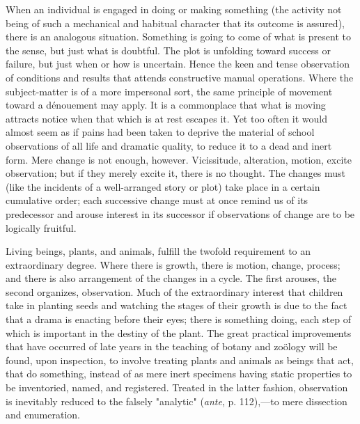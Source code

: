 \documentclass[letterpaper]{book}
\begin{document}
When an individual is engaged in doing or making something (the activity
not being of such a mechanical and habitual character that its outcome
is assured), there is an analogous situation. Something is going to come
of what is present to the sense, but just what is doubtful. The plot is
unfolding toward success or failure, but just when or how is uncertain.
Hence the keen and tense observation of conditions and results that
attends constructive manual operations. Where the subject-matter is of a
more impersonal sort, the same principle of movement toward a dénouement
may apply. It is a commonplace that what is moving attracts notice when
that which is at rest escapes it. Yet too often it would almost seem as
if pains had been taken to deprive the material of school observations
of all life and dramatic quality, to reduce it to a dead and inert form.
Mere change is not enough, however. Vicissitude, alteration, motion,
excite observation; but if they merely excite it, there is no thought.
The changes must (like the incidents of a well-arranged story or plot)
take place in a certain cumulative order; each successive change must at
once remind us of its predecessor and arouse interest in its successor
if observations of change are to be logically fruitful.


Living beings, plants, and animals, fulfill the twofold requirement to
an extraordinary degree. Where
there
is growth, there is motion, change, process; and there is also
arrangement of the changes in a cycle. The first arouses, the second
organizes, observation. Much of the extraordinary interest that children
take in planting seeds and watching the stages of their growth is due to
the fact that a drama is enacting before their eyes; there is something
doing, each step of which is important in the destiny of the plant. The
great practical improvements that have occurred of late years in the
teaching of botany and zoölogy will be found, upon inspection, to
involve treating plants and animals as beings that act, that do
something, instead of as mere inert specimens having static properties
to be inventoried, named, and registered. Treated in the latter fashion,
observation is inevitably reduced to the falsely "analytic"
(\emph{ante}, p. 112),---to mere dissection and enumeration.

\end{document}
